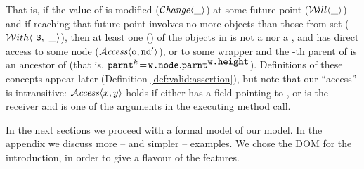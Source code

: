 That is, if the value of  is modified
($\Changes{\_}$) at some future point ($\Future{\_}$) and if reaching
that future point involves no more objects than those from set 
(\ie ${\Using{\_} {\prg{S}}}$), then at least one () of the
objects in  is not a  nor a ,
and  has direct access to some node
($\CanAccess{\prg{o}}{\prg{nd}'}$), or to some wrapper  and
the -th parent of  is an ancestor of 
(that is,
$\prg{parnt}^k\!=\!\prg{w.node}.\prg{parnt}^{\prg{w.height}}$).
Definitions of these concepts appear later
(Definition \ref{def:valid:assertion}), but note that our ``access''
is intransitive: $\CanAccess x y$ holds if either  has a field
pointing to , or  is the receiver and  is one of
the arguments in the executing method call.
 
In the next sections we proceed with a formal model of our model. In the appendix we discuss more -- and simpler -- examples.
We chose the DOM for the introduction, in order to give a flavour of the \Chainmail features.
 
